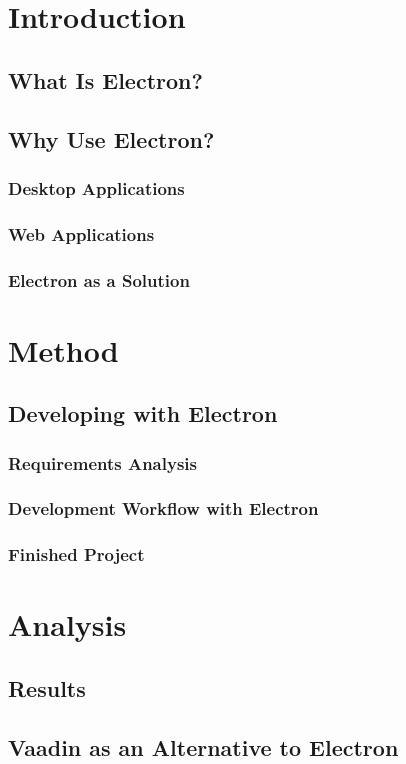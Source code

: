 \documentclass[11pt]{article}
\begin{document}
    \tableofcontents

    \section{Introduction}\label{sec:introduction}
    \setcounter{tocdepth}{3}
    \subsection{What Is Electron?}\label{subsec:what-is-electron}
    
    \subsection{Why Use Electron?}\label{subsec:why-use-electron}
    \subsubsection{Desktop Applications}\label{subsubsec:desktop-applications}
    \subsubsection{Web Applications}\label{subsubsec:web-applications}
    \subsubsection{Electron as a Solution}\label{subsubsec:electron-as-solution}
    \section{Method}\label{sec:method}
    \subsection{Developing with Electron}\label{subsec:developing-with-electron}
    \subsubsection{Requirements Analysis}\label{subsubsec:dev-requirements}
    \subsubsection{Development Workflow with Electron}\label{subsubsec:dev-workflow}
    \subsubsection{Finished Project}\label{subsubsec:dev-project}
    \section{Analysis}\label{sec:analysis}
    \subsection{Results}\label{subsec:results}
    \subsection{Vaadin as an Alternative to Electron}\label{subsec:vaadin-electron}
    
    
\end{document}
